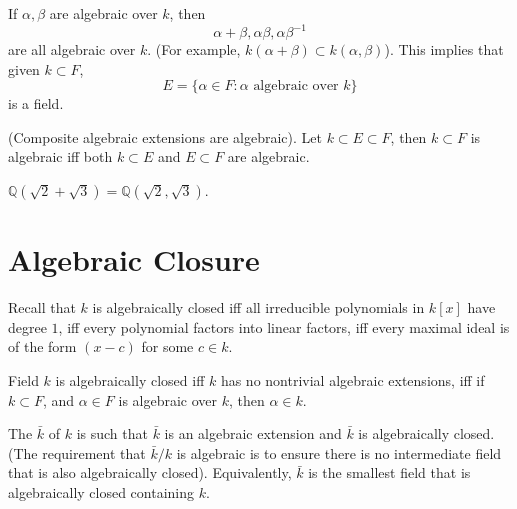 \documentclass[openany]{book}
\newcommand{\Q}{\mathbb{Q}}
\begin{document}
\begin{prop}
    If $\alpha,\beta$ are algebraic over $k$, then 
    \begin{equation*}
        \alpha+\beta, \alpha\beta, \alpha\beta^{-1}
    \end{equation*}
    are all algebraic over $k$. (For example, $k(\alpha+\beta)\subset k(\alpha,\beta)$). This implies that given $k\subset F$, 
    \begin{equation*}
        E=\{\alpha\in F: \alpha \text{ algebraic over }k \}
    \end{equation*}
    is a field.
\end{prop}




\begin{prop}
    (Composite algebraic extensions are algebraic). Let $k\subset E\subset F$, then $k\subset F$ is algebraic iff both $k\subset E$ and $E\subset F$ are algebraic.
\end{prop}


\begin{example}
    $\Q(\sqrt{2}+\sqrt{3})=\Q(\sqrt{2},\sqrt{3})$.
\end{example}

\section{Algebraic Closure}

\begin{prop}
    Recall that $k$ is algebraically closed iff all irreducible polynomials in $k[x]$ have degree $1$, iff every polynomial factors into linear factors, iff every maximal ideal is of the form $(x-c)$ for some $c\in k$.
\end{prop}


\begin{prop}
    Field $k$ is algebraically closed iff $k$ has no nontrivial algebraic extensions, iff if $k\subset F$, and $\alpha\in F$ is algebraic over $k$, then $\alpha\in k$.
\end{prop}


\begin{defn}
    The $\bar{k}$ of $k$ is such that $\bar{k}$ is an algebraic extension and $\bar{k}$ is algebraically closed. (The requirement that $\bar{k}/k$ is algebraic is to ensure there is no intermediate field that is also algebraically closed). Equivalently, $\bar{k}$ is the smallest field that is algebraically closed containing $k$.
\end{defn}
\end{document}

